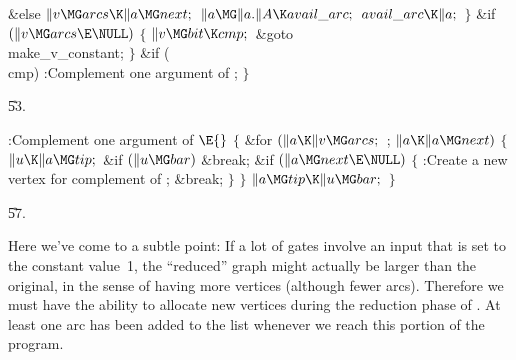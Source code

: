 \&{else}\1\5
${}\|v\MG\\{arcs}\K\|a\MG\\{next};{}$\2\6
${}\|a\MG\|a.\|A\K\\{avail\_arc};{}$\6
${}\\{avail\_arc}\K\|a;{}$\6
\4${}\}{}$\2\6
\&{if} ${}(\|v\MG\\{arcs}\E\NULL){}$\5
${}\{{}$\1\6
${}\|v\MG\\{bit}\K\\{cmp};{}$\6
\&{goto} \\{make\_v\_constant};\6
\4${}\}{}$\2\6
\&{if} (\\{cmp})\1\5
:Complement one argument of \X;\2\6
\4${}\}{}$\2\par
\U53.\fi

\B{}:Complement one argument of \X${}\E{}$\6
${}\{{}$\1\6
\&{for} ${}(\|a\K\|v\MG\\{arcs};{}$  ; ${}\|a\K\|a\MG\\{next}){}$\5
${}\{{}$\1\6
${}\|u\K\|a\MG\\{tip};{}$\6
\&{if} ${}(\|u\MG\\{bar}){}$\1\5
\&{break};\2\6
\&{if} ${}(\|a\MG\\{next}\E\NULL){}$\5
${}\{{}$\1\6
:Create a new vertex for complement of \X;\6
\&{break};\6
\4${}\}{}$\2\6
\4${}\}{}$\2\6
${}\|a\MG\\{tip}\K\|u\MG\\{bar};{}$\6
\4${}\}{}$\2\par
\U57.\fi

Here we've come to a subtle point: If a lot of  gates involve
an input that is set to the constant value~1, the ``reduced'' graph
might actually be larger than the original, in the sense of having
more vertices (although fewer arcs).  Therefore we must have the
ability to allocate new vertices during the reduction phase of
. At least one arc has been added to the 
list
whenever we reach this portion of the program.

